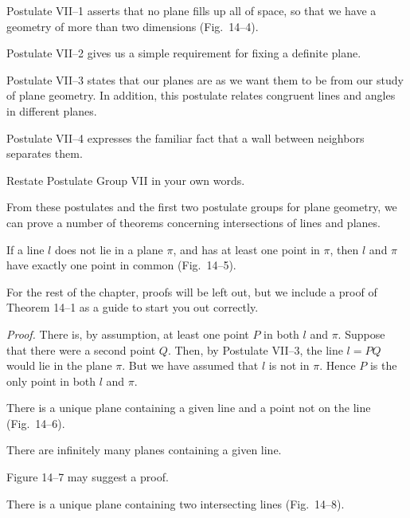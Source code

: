 \documentclass[11pt]{book}
\begin{document}
Postulate VII--1 asserts that no plane fills up all of space, so that we have a
geometry of more than two dimensions (Fig.~14--4).

Postulate VII--2 gives us a simple requirement for fixing a definite plane.

Postulate VII--3 states that our planes are as we want them to be from our study
of plane geometry. In addition, this postulate relates congruent lines and
angles in different planes.

Postulate VII--4 expresses the familiar fact that a wall between neighbors
separates them.

\FIGXIVFOURFIVE

Restate Postulate Group VII in your own words.

From these postulates and the first two postulate groups for plane geometry, we
can prove a number of theorems concerning intersections of lines and planes.

\begin{theorem}
If a line $l$ does not lie in a plane $\pi$, and has at least one point in
$\pi$, then $l$ and $\pi$ have exactly one point in common (Fig.~14--5).
\end{theorem}

For the rest of the chapter, proofs will be left out, but we include a proof of
Theorem 14--1 as a guide to start you out correctly.

\noindent\emph{Proof.} There is, by assumption, at least one point $P$ in both
$l$ and $\pi$. Suppose that there were a second point $Q$. Then, by Postulate
VII--3, the line $l = PQ$ would lie in the plane $\pi$. But we have assumed that
$l$ is not in $\pi$. Hence $P$ is the only point in both $l$ and $\pi$.

\FIGXIVSIXSEVEN

\begin{theorem}
There is a unique plane containing a given line and a point not on the line
(Fig.~14--6).
\end{theorem}

\begin{theorem}
There are infinitely many planes containing a given line.
\end{theorem}

\noindent Figure 14--7 may suggest a proof.

\begin{theorem}
There is a unique plane containing two intersecting lines (Fig.~14--8).
\end{theorem}
\end{document}
